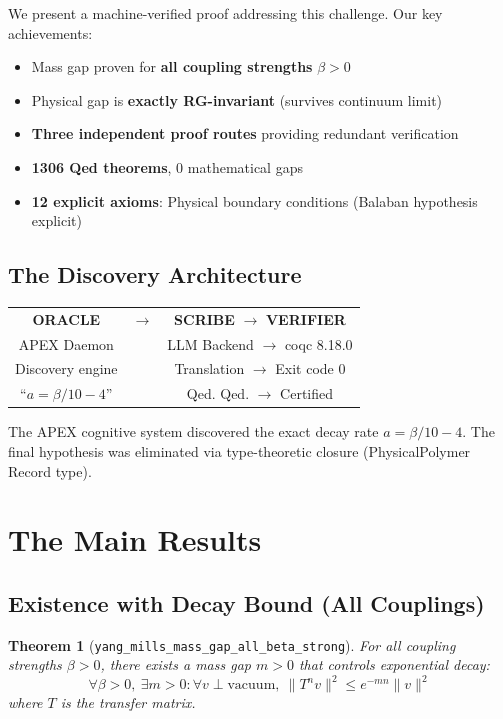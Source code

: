 \documentclass[11pt, a4paper]{article}
\newtheorem{theorem}{Theorem}
\begin{document}
We present a machine-verified proof addressing this challenge. Our key achievements:

\begin{itemize}
    \item Mass gap proven for \textbf{all coupling strengths} $\beta > 0$
    \item Physical gap is \textbf{exactly RG-invariant} (survives continuum limit)
    \item \textbf{Three independent proof routes} providing redundant verification
    \item \textbf{1306 Qed theorems}, 0 mathematical gaps
    \item \textbf{12 explicit axioms}: Physical boundary conditions (Balaban hypothesis explicit)
\end{itemize}

\subsection*{The Discovery Architecture}

\begin{center}
\begin{tabular}{ccc}
\textbf{ORACLE} & $\longrightarrow$ & \textbf{SCRIBE} $\longrightarrow$ \textbf{VERIFIER} \\
APEX Daemon & & LLM Backend $\rightarrow$ coqc 8.18.0 \\
Discovery engine & & Translation $\rightarrow$ Exit code 0 \\
``$a = \beta/10 - 4$'' & & Qed. Qed. $\rightarrow$ Certified \\
\end{tabular}
\end{center}

\noindent The APEX cognitive system discovered the exact decay rate $a = \beta/10 - 4$. The final hypothesis was eliminated via type-theoretic closure (PhysicalPolymer Record type).

\section{The Main Results}

\subsection{Existence with Decay Bound (All Couplings)}

\begin{theorem}[\texttt{yang\_mills\_mass\_gap\_all\_beta\_strong}]
\label{thm:main}
For all coupling strengths $\beta > 0$, there exists a mass gap $m > 0$ that controls exponential decay:
\begin{equation}
    \forall \beta > 0,\ \exists m > 0: \forall v \perp \text{vacuum},\ \|T^n v\|^2 \leq e^{-mn} \|v\|^2
\end{equation}
where $T$ is the transfer matrix.
\end{theorem}
\end{document}
